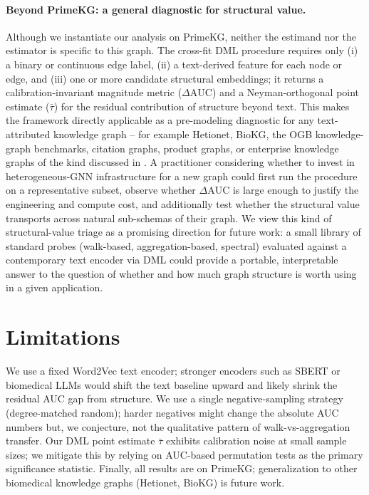 \documentclass{article}
\theoremstyle{plain}
\theoremstyle{definition}
\theoremstyle{remark}
\begin{document}
\paragraph{Beyond PrimeKG: a general diagnostic for structural value.}
Although we instantiate our analysis on PrimeKG, neither the estimand nor the estimator is specific to this graph. The cross-fit DML procedure requires only (i) a binary or continuous edge label, (ii) a text-derived feature for each node or edge, and (iii) one or more candidate structural embeddings; it returns a calibration-invariant magnitude metric ($\Delta\mathrm{AUC}$) and a Neyman-orthogonal point estimate ($\bar\tau$) for the residual contribution of structure beyond text. This makes the framework directly applicable as a pre-modeling diagnostic for any text-attributed knowledge graph -- for example Hetionet, BioKG, the OGB knowledge-graph benchmarks, citation graphs, product graphs, or enterprise knowledge graphs of the kind discussed in \citet{hogan2021}. A practitioner considering whether to invest in heterogeneous-GNN infrastructure for a new graph could first run the procedure on a representative subset, observe whether $\Delta\mathrm{AUC}$ is large enough to justify the engineering and compute cost, and additionally test whether the structural value transports across natural sub-schemas of their graph. We view this kind of structural-value triage as a promising direction for future work: a small library of standard probes (walk-based, aggregation-based, spectral) evaluated against a contemporary text encoder via DML could provide a portable, interpretable answer to the question of whether and how much graph structure is worth using in a given application.

\section{Limitations}

We use a fixed Word2Vec text encoder; stronger encoders such as SBERT or biomedical LLMs would shift the text baseline upward and likely shrink the residual AUC gap from structure. We use a single negative-sampling strategy (degree-matched random); harder negatives might change the absolute AUC numbers but, we conjecture, not the qualitative pattern of walk-vs-aggregation transfer. Our DML point estimate $\bar\tau$ exhibits calibration noise at small sample sizes; we mitigate this by relying on AUC-based permutation tests as the primary significance statistic. Finally, all results are on PrimeKG; generalization to other biomedical knowledge graphs (Hetionet, BioKG) is future work.
\end{document}
